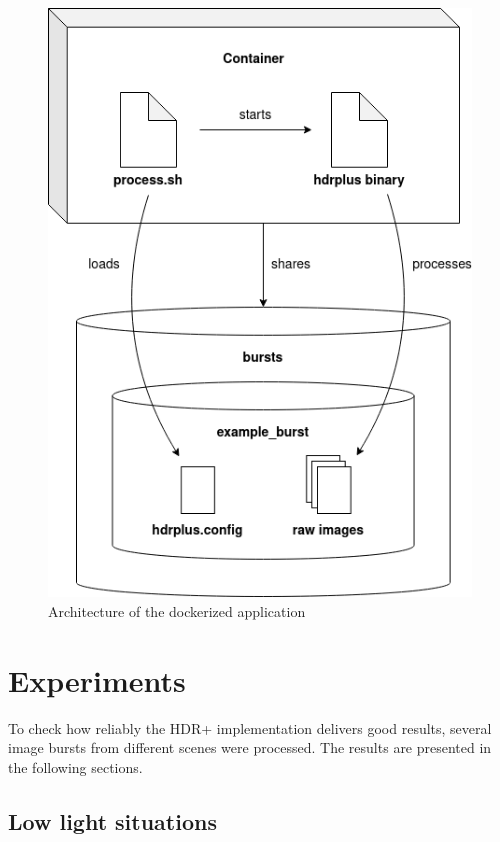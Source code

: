 \documentclass{egpubl}
\begin{document}
\begin{figure}
    \hspace{\fill}
    \includegraphics[width=0.9\linewidth]{images/architecture.png}
    \hspace{\fill}
    \centering
    \caption{Architecture of the dockerized application}
    \label{fig:architecture}
\end{figure}

\section{Experiments}
\label{sec:experiments}

To check how reliably the HDR+ implementation delivers good results, 
several image bursts from different scenes were processed. The results 
are presented in the following sections.

\subsection{Low light situations}
\label{lowlight}
\end{document}
